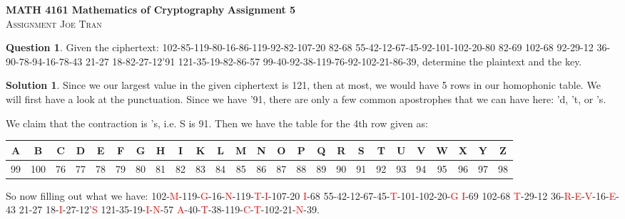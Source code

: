 \documentclass[11pt]{article}
\date{January 9, 2024}
\theoremstyle{definition}\newtheorem{definition}{Definition}
\theoremstyle{definition}\newtheorem{question}{Question}
\theoremstyle{definition}\newtheorem*{solution}{Solution}
\begin{document}
\noindent \textbf{MATH 4161 Mathematics of Cryptography} \hfill \textbf{Assignment 5} \\
\noindent \textsc{Assignment} \hfill \textsc{Joe Tran}

\begin{question}
    Given the ciphertext: \textsf{102-85-119-80-16-86-119-92-82-107-20 
    82-68 
    55-42-12-67-45-92-101-102-20-80 
    82-69 
    102-68 
    92-29-12 
    36-90-78-94-16-78-43 
    21-27 
    18-82-27-12'91 
    121-35-19-82-86-57 
    99-40-92-38-119-76-92-102-21-86-39}, determine the plaintext and the key.
\end{question}

\begin{solution}
    Since we our largest value in the given ciphertext is \textsf{121}, then at most, we would have 5 rows in our homophonic table. We will first have a look at the punctuation. Since we have '91, there are only a few common apostrophes that we can have here: 'd, 't, or 's.

    We claim that the contraction is 's, i.e. S is 91. Then we have the table for the 4th row given as:
    \begin{center}\tiny\hspace*{-20pt}
        \begin{tabular}{ccccccccccccccccccccccccc} \hline
            A & B & C & D & E & F & G & H & I & K & L & M & N & O & P & Q & R & S & T & U & V & W & X & Y & Z \\ \hline
            99 & 100 & 76 & 77 & 78 & 79 & 80 & 81 & 82 & 83 & 84 & 85 & 86 & 87 & 88 & 89 & 90 & 91 & 92 & 93 & 94 & 95 & 96 & 97 & 98 \\ \hline
        \end{tabular}
    \end{center}
    So now filling out what we have: 102-\textcolor{red}{M}-119-\textcolor{red}{G}-16-\textcolor{red}{N}-119-\textcolor{red}{T}-\textcolor{red}{I}-107-20 \textcolor{red}{I}-68 55-42-12-67-45-\textcolor{red}{T}-101-102-20-\textcolor{red}{G} \textcolor{red}{I}-69 102-68 \textcolor{red}{T}-29-12 36-\textcolor{red}{R}-\textcolor{red}{E}-\textcolor{red}{V}-16-\textcolor{red}{E}-43 21-27 18-\textcolor{red}{I}-27-12'\textcolor{red}{S} 121-35-19-\textcolor{red}{I}-\textcolor{red}{N}-57 \textcolor{red}{A}-40-\textcolor{red}{T}-38-119-\textcolor{red}{C}-\textcolor{red}{T}-102-21-\textcolor{red}{N}-39.


\end{solution}
\end{document}
